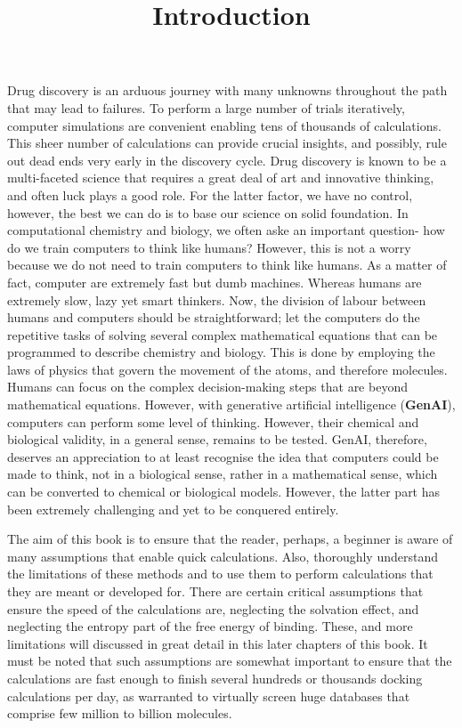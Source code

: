 \documentclass[12pt, a4paper]{article}
\title{Introduction}
\begin{document}
\maketitle

Drug discovery is an arduous journey with many unknowns throughout the path that may lead to failures. To perform a large number of trials iteratively, computer simulations are convenient enabling tens of thousands of calculations. This sheer number of calculations can provide crucial insights, and possibly, rule out dead ends very early in the discovery cycle. Drug discovery is known to be a multi-faceted science that requires a great deal of art and innovative thinking, and often luck plays a good role. For the latter factor, we have no control, however, the best we can do is to base our science on solid foundation. In computational chemistry and biology, we often aske an important question- how do we train computers to think like humans? However, this is not a worry because we do not need to train computers to think like humans. As a matter of fact, computer are extremely fast but dumb machines. Whereas humans are extremely slow, lazy yet smart thinkers. Now, the division of labour between humans and computers should be straightforward; let the computers do the repetitive tasks of solving several complex mathematical equations that can be programmed to describe chemistry and biology. This is done by employing the laws of physics that govern the movement of the atoms, and therefore molecules. Humans can focus on the complex decision-making steps that are beyond mathematical equations. However, with generative artificial intelligence (\textbf{GenAI}), computers can perform some level of thinking. However, their chemical and biological validity, in a general sense, remains to be tested. GenAI, therefore, deserves an appreciation to at least recognise the idea that computers could be made to think, not in a biological sense, rather in a mathematical sense, which can be converted to chemical or biological models. However, the latter part has been extremely challenging and yet to be conquered entirely. 

The aim of this book is to ensure that the reader, perhaps, a beginner is aware of many assumptions that enable quick calculations. Also, thoroughly understand the limitations of these methods and to use them to perform calculations that they are meant or developed for. There are certain critical assumptions that ensure the speed of the calculations are, neglecting the solvation effect, and neglecting the entropy part of the free energy of binding. These, and more limitations will discussed in great detail in this later chapters of this book. It must be noted that such assumptions are somewhat important to ensure that the calculations are fast enough to finish several hundreds or thousands docking calculations per day, as warranted to virtually screen huge databases that comprise few million to billion molecules. 
\end{document}
